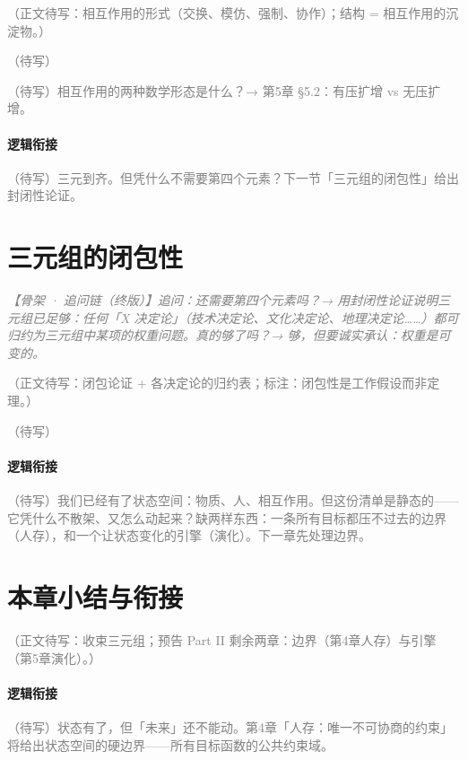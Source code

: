 \documentclass[../../main2.tex]{subfiles}
\begin{document}
	\textcolor{gray}{（正文待写：相互作用的形式（交换、模仿、强制、协作）；结构 = 相互作用的沉淀物。）}

	\begin{readingnote}
		\textcolor{gray}{（待写）}
	\end{readingnote}

	\begin{reader_anticipation}
		\item \textcolor{gray}{（待写）相互作用的两种数学形态是什么？→ 第5章 §5.2：有压扩增 vs 无压扩增。}
	\end{reader_anticipation}

	\paragraph*{逻辑衔接}
	\textcolor{gray}{（待写）三元到齐。但凭什么不需要第四个元素？下一节「三元组的闭包性」给出封闭性论证。}

	\section{三元组的闭包性}
	\label{sec:state-closure}

	\textcolor{gray}{\textit{【骨架 · 追问链（终版）】追问：还需要第四个元素吗？→ 用封闭性论证说明三元组已足够：任何「X 决定论」（技术决定论、文化决定论、地理决定论……）都可归约为三元组中某项的权重问题。真的够了吗？→ 够，但要诚实承认：权重是可变的。}}

	\textcolor{gray}{（正文待写：闭包论证 + 各决定论的归约表；\lowfreq 标注：闭包性是工作假设而非定理。）}

	\begin{readingnote}
		\textcolor{gray}{（待写）}
	\end{readingnote}

	\paragraph*{逻辑衔接}
	\textcolor{gray}{（待写）我们已经有了状态空间：物质、人、相互作用。但这份清单是静态的——它凭什么不散架、又怎么动起来？缺两样东西：一条所有目标都压不过去的边界（人存），和一个让状态变化的引擎（演化）。下一章先处理边界。}

	\section{本章小结与衔接}
	\label{sec:state-summary}

	\textcolor{gray}{（正文待写：收束三元组；预告 Part II 剩余两章：边界（第4章人存）与引擎（第5章演化）。）}

	\paragraph*{逻辑衔接}
	\textcolor{gray}{（待写）状态有了，但「未来」还不能动。第4章「人存：唯一不可协商的约束」将给出状态空间的硬边界——所有目标函数的公共约束域。}
\end{document}
